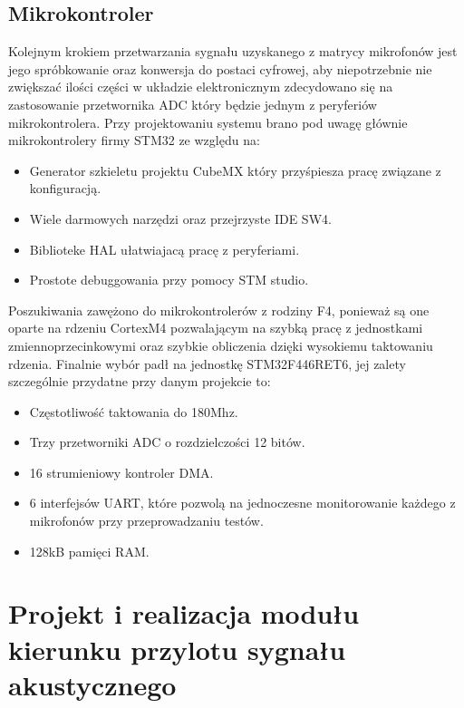 \documentclass[eng,printmode]{mgr}
\begin{document}
\section{Mikrokontroler}
Kolejnym krokiem przetwarzania sygnału uzyskanego z matrycy mikrofonów jest jego spróbkowanie oraz konwersja do postaci cyfrowej, aby niepotrzebnie nie zwiększać ilości części w układzie elektronicznym zdecydowano się na zastosowanie przetwornika ADC który będzie jednym z peryferiów mikrokontrolera. Przy projektowaniu systemu brano pod uwagę głównie mikrokontrolery firmy STM32 ze względu na:
\begin{itemize}
\item Generator szkieletu projektu CubeMX który przyśpiesza pracę związane z konfiguracją.
\item Wiele darmowych narzędzi oraz przejrzyste IDE SW4.
\item Biblioteke HAL ułatwiajacą pracę z peryferiami.
\item Prostote debuggowania przy pomocy STM studio.
\end{itemize} 
Poszukiwania zawężono do mikrokontrolerów z rodziny F4, ponieważ są one oparte na rdzeniu CortexM4 pozwalającym na szybką pracę z jednostkami zmiennoprzecinkowymi oraz szybkie obliczenia dzięki wysokiemu taktowaniu rdzenia. Finalnie wybór padł na jednostkę STM32F446RET6, jej zalety szczególnie przydatne przy danym projekcie to:
\begin{itemize}
\item Częstotliwość taktowania do 180Mhz.
\item Trzy przetworniki ADC o rozdzielczości 12 bitów.
\item 16 strumieniowy kontroler DMA.
\item 6 interfejsów UART, które pozwolą na jednoczesne monitorowanie każdego z mikrofonów przy przeprowadzaniu testów.
\item 128kB pamięci RAM.
\end{itemize} 
\chapter{Projekt i realizacja modułu
 kierunku przylotu sygnału akustycznego}
 
\end{document}
